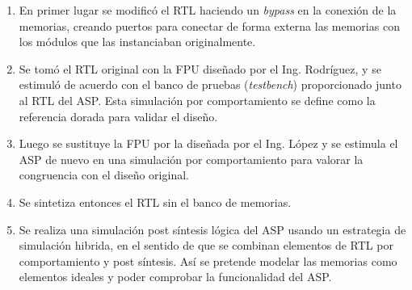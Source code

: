 \begin{enumerate}

\item En primer lugar se modificó el RTL haciendo un \textit{bypass} en la conexión de la memorias, creando puertos para conectar de forma externa las memorias con los módulos que las instanciaban originalmente.

\item Se tomó el RTL original con la FPU diseñado por el Ing. Rodríguez, y se estimuló de acuerdo con el banco de pruebas (\textit{testbench}) proporcionado junto al RTL del ASP. Esta simulación por comportamiento se define como la referencia dorada para validar el diseño.

\item Luego se sustituye la FPU por la diseñada por el Ing. López y se estimula el ASP de nuevo en una simulación por comportamiento para valorar la congruencia con el diseño original.

\item Se sintetiza entonces el RTL sin el banco de memorias.

\item Se realiza una simulación post síntesis lógica del ASP usando un estrategia de simulación hibrida, en el sentido de que se combinan elementos de RTL por comportamiento y post síntesis. Así se pretende modelar las memorias como elementos ideales y poder comprobar la funcionalidad del ASP.
\end{enumerate}




